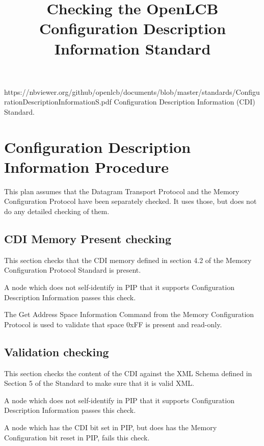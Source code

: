 

\title{Checking the OpenLCB Configuration Description Information Standard}


\maketitle


\introductionCaveats
    {https://nbviewer.org/github/openlcb/documents/blob/master/standards/ConfigurationDescriptionInformationS.pdf}
    {Configuration Description Information (CDI) Standard}.

\section{Configuration Description Information Procedure}


This plan assumes that the Datagram Transport Protocol and the Memory Configuration Protocol 
have been separately checked. It uses those, but does not do any detailed checking of them.

\subsection{CDI Memory Present checking}

This section checks that the CDI memory defined in section 4.2 of the Memory
Configuration Protocol Standard is present.

A node which does not self-identify in PIP that it supports
Configuration Description Information passes this check.

The Get Address Space Information Command from the Memory Configuration Protocol
is used to validate that space 0xFF is present and read-only.

\subsection{Validation checking}

This section checks the content of the CDI against the XML Schema 
defined in Section 5 of the Standard to make sure that it is valid XML. 

A node which does not self-identify in PIP that it supports
Configuration Description Information passes this check.

A node which has the CDI bit set in PIP, but does
has the Memory Configuration bit reset in PIP, fails this check.
\pipsetFootnote


